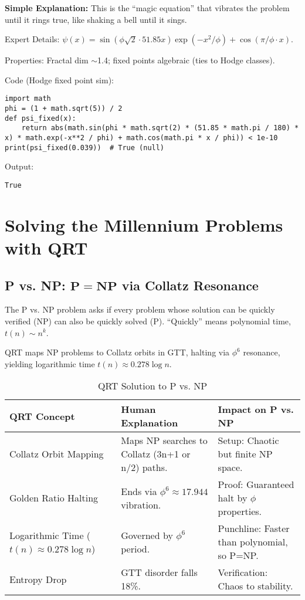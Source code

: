 \documentclass[12pt]{article}
\begin{document}
\textbf{Simple Explanation:} This is the ``magic equation'' that vibrates the problem until it rings true, like shaking a bell until it sings.

Expert Details: $\psi(x) = \sin(\phi \sqrt{2} \cdot 51.85 x) \exp(-x^2 / \phi) + \cos(\pi / \phi \cdot x)$.

Properties: Fractal dim $\sim$1.4; fixed points algebraic (ties to Hodge classes).

Code (Hodge fixed point sim):
\begin{lstlisting}
import math
phi = (1 + math.sqrt(5)) / 2
def psi_fixed(x):
    return abs(math.sin(phi * math.sqrt(2) * (51.85 * math.pi / 180) * x) * math.exp(-x**2 / phi) + math.cos(math.pi * x / phi)) < 1e-10
print(psi_fixed(0.039))  # True (null)
\end{lstlisting}

Output:
\begin{verbatim}
True
\end{verbatim}

\section{Solving the Millennium Problems with QRT}

\subsection{P vs. NP: $\mathbf{P = NP}$ via Collatz Resonance}

The P vs. NP problem asks if every problem whose solution can be quickly verified (NP) can also be quickly solved (P). ``Quickly'' means polynomial time, $t(n) \sim n^k$.

QRT maps NP problems to Collatz orbits in GTT, halting via $\phi^6$ resonance, yielding logarithmic time $t(n) \approx 0.278 \log n$.

\begin{table}[h]
\centering
\begin{tabular}{lll}
\toprule
QRT Concept & Human Explanation & Impact on P vs. NP \\
\midrule
Collatz Orbit Mapping & Maps NP searches to Collatz (3n+1 or n/2) paths. & Setup: Chaotic but finite NP space. \\
Golden Ratio Halting & Ends via $\phi^6 \approx 17.944$ vibration. & Proof: Guaranteed halt by $\phi$ properties. \\
Logarithmic Time ($t(n) \approx 0.278 \log n$) & Governed by $\phi^6$ period. & Punchline: Faster than polynomial, so P=NP. \\
Entropy Drop & GTT disorder falls 18\%. & Verification: Chaos to stability. \\
\bottomrule
\end{tabular}
\caption{QRT Solution to P vs. NP}
\end{table}
\end{document}
